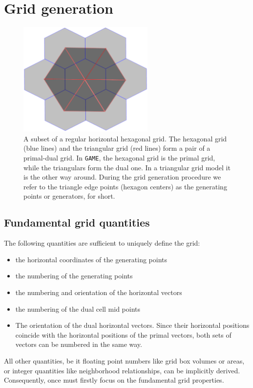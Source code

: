 \documentclass[10pt]{report}
\begin{document}
\chapter{Grid generation}
\label{chap:grid_generation}

\begin{figure}
\begin{center}
\includegraphics[width = 0.6\textwidth]{hexagonal_grid_0.pdf}
\caption{A subset of a regular horizontal hexagonal grid. The hexagonal grid (blue lines) and the triangular grid (red lines) form a pair of a primal-dual grid. In \texttt{GAME}, the hexagonal grid is the primal grid, while the triangulars form the dual one. In a triangular grid model it is the other way around. During the grid generation procedure we refer to the triangle edge points (hexagon centers) as the generating points or generators, for short.}
\label{fig:hexagonal_grid_0}
\end{center}
\end{figure}

\section{Fundamental grid quantities}
\label{sec:fundamental_grid_quantities}

The following quantities are sufficient to uniquely define the grid:

\begin{itemize}
\item the horizontal coordinates of the generating points
\item the numbering of the generating points
\item the numbering and orientation of the horizontal vectors
\item the numbering of the dual cell mid points
\item The orientation of the dual horizontal vectors. Since their horizontal positions coincide with the horizontal positions of the primal vectors, both sets of vectors can be numbered in the same way.
\end{itemize}
%
All other quantities, be it floating point numbers like grid box volumes or areas, or integer quantities like neighborhood relationships, can be implicitly derived. Consequently, once must firstly focus on the fundamental grid properties.
\end{document}
